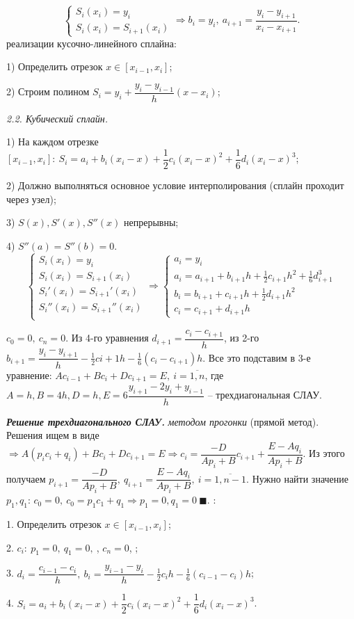 \documentclass[9pt]{article}
\begin{document}
\[\left\{\begin{array}{l}
    S_i(x_i)=y_i \\
    S_i(x_i)=S_{i+1}(x_i)
\end{array}\right.\Rightarrow b_i=y_i,\ a_{i+1}=\dfrac{y_i-y_{i+1}}{x_i-x_{i+1}}.\]
 реализации кусочно-линейного сплайна:
\par1) Определить отрезок \(x\in[x_{i-1},x_i]\);
\par2) Строим полином \(S_i=y_i+\dfrac{y_i-y_{i-1}}{h}(x-x_i)\);
\par\textit{2.2. Кубический сплайн.}
\par1) На каждом отрезке \([x_{i-1},x_i]:\ S_i=a_i+b_i(x_i-x)+\dfrac{1}{2}c_i(x_i-x)^2+\dfrac{1}{6}d_i(x_i-x)^3\);
\par2) Должно выполняться основное условие интерполирования (сплайн проходит через узел);
\par3) \(S(x),S'(x),S''(x)\) непрерывны;
\par4) \(S''(a)=S''(b)=0.\)
\[\left\{
\begin{array}{l}
    S_i(x_i)=y_i \\
    S_i(x_i)=S_{i+1}(x_i) \\
    S_i'(x_i)=S_{i+1}'(x_i) \\
    S_i''(x_i)=S_{i+1}''(x_i) \\
\end{array}\right.\Rightarrow\left\{
\begin{array}{l}
    a_i=y_i \\
    a_i=a_{i+1}+b_{i+1}h+\frac{1}{2}c_{i+1}h^2+\frac{1}{6}d_{i+1}^3 \\
    b_i=b_{i+1}+c_{i+1}h+\frac{1}{2}d_{i+1}h^2 \\
    c_i=c_{i+1}+d_{i+1}h
\end{array}
\right.\]
\par\(c_0=0,\ c_n=0\). Из 4-го уравнения \(d_{i+1}=\dfrac{c_i-c_{i+1}}{h}\), из 2-го \(b_{i+1}=\dfrac{y_i-y_{i+1}}{h}-\frac{1}{2}c{i+1}h-\frac{1}{6}(c_i-c_{i+1})h\). Все это подставим в 3-е уравнение: \(Ac_{i-1}+Bc_i+Dc_{i+1}=E,\ i=\overline{1,n}\), где \(A=h,B=4h,D=h,E=6\dfrac{y_{i+1}-2y_i+y_{i-1}}{h}\) -- трехдиагональная СЛАУ.
\par\textbf{\textit{Решение трехдиагонального СЛАУ.}}
 \textit{методом прогонки} (прямой метод). Решения ищем в виде  \(\Rightarrow A(p_ic_i+q_i)+Bc_i+Dc_{i+1}=E\Rightarrow c_i=\dfrac{-D}{Ap_i+B}c_{i+1}+\dfrac{E-Aq_i}{Ap_i+B}\). Из этого получаем \(p_{i+1}=\dfrac{-D}{Ap_i+B},\ q_{i+1}=\dfrac{E-Aq_i}{Ap_i+B},\ i=\overline{1,n-1}\). Нужно найти значение \(p_1,q_1\): \(c_0=0,\ c_0=p_1c_1+q_1\Rightarrow p_1=0,q_1=0\ \blacksquare\).
:
\par1. Определить отрезок \(x\in[x_{i-1},x_i]\);
\par2. \(c_i:\ p_1=0,\ q_1=0,\ \), \(c_n=0\), ;
\par3. \(d_i=\dfrac{c_{i-1}-c_i}{h},\ b_i=\dfrac{y_{i-1}-y_i}{h}-\frac{1}{2}c_ih-\frac{1}{6}(c_{i-1}-c_i)h\);
\par4. \(S_i=a_i+b_i(x_i-x)+\dfrac{1}{2}c_i(x_i-x)^2+\dfrac{1}{6}d_i(x_i-x)^3\).
\end{document}
